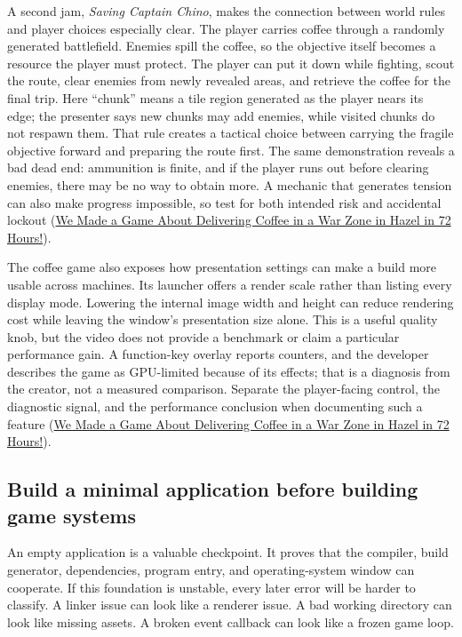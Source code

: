A second jam, \emph{Saving Captain Chino}, makes the connection between world rules and player choices especially clear. The player carries coffee through a randomly generated battlefield. Enemies spill the coffee, so the objective itself becomes a resource the player must protect. The player can put it down while fighting, scout the route, clear enemies from newly revealed areas, and retrieve the coffee for the final trip. Here ``chunk'' means a tile region generated as the player nears its edge; the presenter says new chunks may add enemies, while visited chunks do not respawn them. That rule creates a tactical choice between carrying the fragile objective forward and preparing the route first. The same demonstration reveals a bad dead end: ammunition is finite, and if the player runs out before clearing enemies, there may be no way to obtain more. A mechanic that generates tension can also make progress impossible, so test for both intended risk and accidental lockout (\href{https://www.youtube.com/watch?v=ahrdtYwBLTk&t=6m42s}{We Made a Game About Delivering Coffee in a War Zone in Hazel in 72 Hours!}).

The coffee game also exposes how presentation settings can make a build more usable across machines. Its launcher offers a render scale rather than listing every display mode. Lowering the internal image width and height can reduce rendering cost while leaving the window's presentation size alone. This is a useful quality knob, but the video does not provide a benchmark or claim a particular performance gain. A function-key overlay reports counters, and the developer describes the game as GPU-limited because of its effects; that is a diagnosis from the creator, not a measured comparison. Separate the player-facing control, the diagnostic signal, and the performance conclusion when documenting such a feature (\href{https://www.youtube.com/watch?v=ahrdtYwBLTk&t=1m7s}{We Made a Game About Delivering Coffee in a War Zone in Hazel in 72 Hours!}).

\subsection{Build a minimal application before building game systems}\label{05-engine-i-ch013-build-a-minimal-application-before-building-game-systems}

An empty application is a valuable checkpoint. It proves that the compiler, build generator, dependencies, program entry, and operating-system window can cooperate. If this foundation is unstable, every later error will be harder to classify. A linker issue can look like a renderer issue. A bad working directory can look like missing assets. A broken event callback can look like a frozen game loop.

